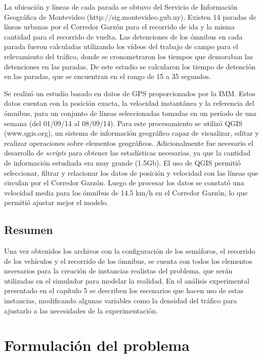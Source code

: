 La ubicación y líneas de cada parada se obtuvo del Servicio de Información Geográfica de Montevideo (http://sig.montevideo.gub.uy). Existen 14 paradas de líneas urbanas por el Corredor Garzón para el recorrido de ida y la misma cantidad para el recorrido de vuelta. Las detenciones de los ómnibus en cada parada fueron calculadas utilizando los vídeos del trabajo de campo para el relevamiento del tráfico, donde se cronometraron los tiempos que demoraban las detenciones en las paradas. De este estudio se calcularon los tiempo de detención en las paradas, que se encuentran en el rango de 15 a 35 segundos.

Se realizó un estudio basado en datos de GPS proporcionados por la IMM. Estos datos cuentan con la posición exacta, la velocidad instantánea y la referencia del ómnibus, para un conjunto de líneas seleccionadas tomadas en un período de una semana (del 01/09/14 al 08/09/14). 
Para este procesamiento se utilizó QGIS (www.qgis.org), un sistema de información geográfico capaz de visualizar, editar y realizar operaciones sobre elementos geográficos. Adicionalmente fue necesario el desarrollo de \emph{scripts} para obtener las estadísticas necesarias, ya que la cantidad de información estudiada era muy grande (1.5Gb). El uso de QGIS permitió seleccionar, filtrar y relacionar los datos de posición y velocidad con las líneas que circulan por el Corredor Garzón. Luego de procesar los datos se constató una velocidad media para los ómnibus de 14.5 km/h en el Corredor Garzón, lo que permitió ajustar mejor el modelo. 


\subsection{Resumen}

Una vez obtenidos los archivos con la configuración de los semáforos, el recorrido de los vehículos y el recorrido de los ómnibus, se cuenta con todos los elementos necesarios para la creación de instancias realistas del problema, que serán utilizadas en el simulador para modelar la realidad.  En el análisis experimental presentado en el capítulo 5 se describen los escenarios que hacen uso de estas instancias, modificando algunas variables como la densidad del tráfico para ajustarlo a las necesidades de la experimentación.

\section{Formulación del problema}

